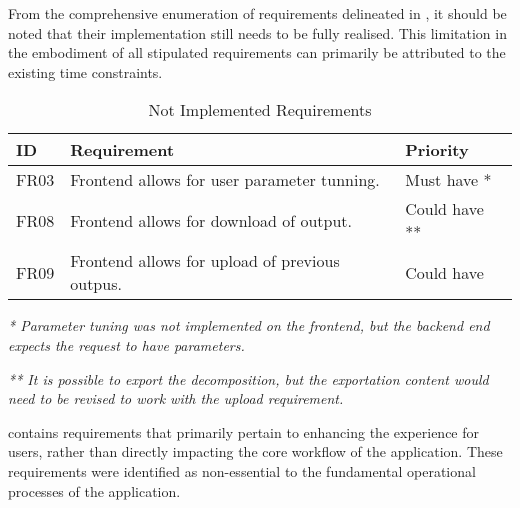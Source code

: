 From the comprehensive enumeration of requirements delineated in
, it should
be noted that their implementation still needs to be fully realised. This
limitation in the embodiment of all stipulated requirements can primarily be
attributed to the existing time constraints.

\begin{table}[!htb] \caption{Not Implemented Requirements} \label{tab:not-implemented-requirements}
  \begin{center}
    \begin{tabular}[c]{p{4em}|p{20em}|p{6em}}
      \textbf{ID} &
      \textbf{Requirement} &
      \textbf{Priority} \\
      \hline FR03 & Frontend allows for user parameter tunning. & {Must have *} \\
      \hline FR08 & Frontend allows for download of output. & {Could have **} \\
      \hline FR09 & Frontend allows for upload of previous outpus. & {Could have} \\
    \end{tabular}
  \end{center}
 \vspace{1ex}
 {\raggedright \textit{* Parameter tuning was not implemented on the frontend, but the backend end expects the request to have parameters.} \par}
 {\raggedright \textit{** It is possible to export the decomposition, but the exportation content would need to be revised to work with the upload requirement.} \par}
\end{table}

 contains requirements that primarily
pertain to enhancing the experience for users, rather than directly impacting
the core workflow of the application. These requirements were identified as
non-essential to the fundamental operational processes of the application.
